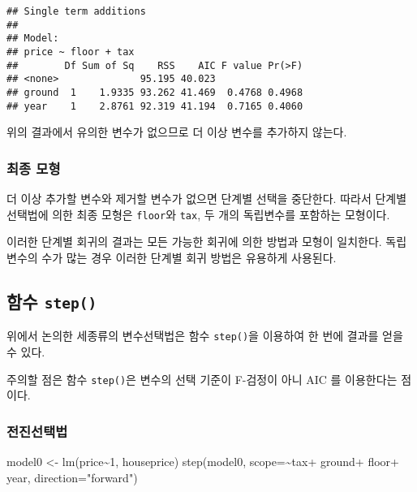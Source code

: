 \documentclass[
]{book}
\makeatletter
\newenvironment{Shaded}{\begin{snugshade}}{\end{snugshade}}
\newcommand{\AttributeTok}[1]{\textcolor[rgb]{0.77,0.63,0.00}{#1}}
\newcommand{\DecValTok}[1]{\textcolor[rgb]{0.00,0.00,0.81}{#1}}
\newcommand{\FunctionTok}[1]{\textcolor[rgb]{0.00,0.00,0.00}{#1}}
\newcommand{\NormalTok}[1]{#1}
\newcommand{\OtherTok}[1]{\textcolor[rgb]{0.56,0.35,0.01}{#1}}
\newcommand{\SpecialCharTok}[1]{\textcolor[rgb]{0.00,0.00,0.00}{#1}}
\newcommand{\StringTok}[1]{\textcolor[rgb]{0.31,0.60,0.02}{#1}}
\newenvironment{kframe}{%
\medskip{}
\setlength{\fboxsep}{.8em}
 \def\at@end@of@kframe{}%
 \ifinner\ifhmode%
  \def\at@end@of@kframe{\end{minipage}}%
  \begin{minipage}{\columnwidth}%
 \fi\fi%
 \def\FrameCommand##1{\hskip\@totalleftmargin \hskip-\fboxsep
 \colorbox{shadecolor}{##1}\hskip-\fboxsep
     \hskip-\linewidth \hskip-\@totalleftmargin \hskip\columnwidth}%
 \MakeFramed {\advance\hsize-\width
   \@totalleftmargin\z@ \linewidth\hsize
   \@setminipage}}%
 {\par\unskip\endMakeFramed%
 \at@end@of@kframe}
\newenvironment{rmdblock}[1]
  {
  \begin{itemize}
  \renewcommand{\labelitemi}{
    \raisebox{-.7\height}[0pt][0pt]{
      {\setkeys{Gin}{width=3em,keepaspectratio}\texttt{[image: images/\#1]}}
    }
  }
  \setlength{\fboxsep}{1em}
  \begin{kframe}
  \item
  }
  {
  \end{kframe}
  \end{itemize}
  }
\newenvironment{rmdcaution}
  {\begin{rmdblock}{caution}}
  {\end{rmdblock}}
\makeatother
\begin{document}
\begin{verbatim}
## Single term additions
## 
## Model:
## price ~ floor + tax
##        Df Sum of Sq    RSS    AIC F value Pr(>F)
## <none>              95.195 40.023               
## ground  1    1.9335 93.262 41.469  0.4768 0.4968
## year    1    2.8761 92.319 41.194  0.7165 0.4060
\end{verbatim}

위의 결과에서 유의한 변수가 없으므로 더 이상 변수를 추가하지 않는다.

\hypertarget{uxcd5cuxc885-uxbaa8uxd615}{%
\subsubsection{최종 모형}\label{uxcd5cuxc885-uxbaa8uxd615}}

더 이상 추가할 변수와 제거할 변수가 없으면 단계별 선택을 중단한다. 따라서 단계별 선택법에 의한
최종 모형은 \texttt{floor}와 \texttt{tax}, 두 개의 독립변수를 포함하는 모형이다.

이러한 단계별 회귀의 결과는 모든 가능한 회귀에 의한 방법과 모형이 일치한다. 독립변수의 수가 많는 경우 이러한 단계별 회귀 방법은 유용하게 사용된다.

\hypertarget{uxd568uxc218-step}{%
\subsection{\texorpdfstring{함수 \texttt{step()}}{함수 step()}}\label{uxd568uxc218-step}}

위에서 논의한 세종류의 변수선택법은 함수 \texttt{step()}을 이용하여 한 번에 결과를 얻을 수 있다.

\begin{rmdcaution}
주의할 점은 함수 \texttt{step()}은 변수의 선택 기준이 F-검정이 아니 AIC 를 이용한다는 점이다.
\end{rmdcaution}

\hypertarget{uxc804uxc9c4uxc120uxd0dduxbc95}{%
\subsubsection{전진선택법}\label{uxc804uxc9c4uxc120uxd0dduxbc95}}

\begin{Shaded}
\begin{Highlighting}[]
\NormalTok{model0 }\OtherTok{\textless{}{-}} \FunctionTok{lm}\NormalTok{(price}\SpecialCharTok{\textasciitilde{}}\DecValTok{1}\NormalTok{, houseprice)}
\FunctionTok{step}\NormalTok{(model0,  }\AttributeTok{scope=}\SpecialCharTok{\textasciitilde{}}\NormalTok{tax}\SpecialCharTok{+}\NormalTok{ ground}\SpecialCharTok{+}\NormalTok{ floor}\SpecialCharTok{+}\NormalTok{ year, }\AttributeTok{direction=}\StringTok{"forward"}\NormalTok{)}
\end{Highlighting}
\end{Shaded}
\end{document}
